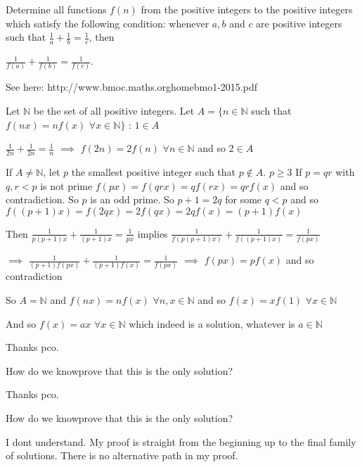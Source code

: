 \begin{solution}
	\begin{tcolorbox}Determine all functions $f(n)$ from the positive integers to the positive integers which satisfy the following condition: whenever $a, b$ and $c$ are positive integers such that $\frac{1}{a} + \frac{1}{b} = \frac{1}{c}$, then

$\frac{1}{f(a)} + \frac{1}{f(b)} = \frac{1}{f(c)}$.

See here: http://www.bmoc.maths.org\/home\/bmo1-2015.pdf\end{tcolorbox}
Let $\mathbb N$ be the set of all positive integers.
Let $A=\{n\in\mathbb N$ such that $f(nx)=nf(x)$ $\forall x\in\mathbb N\}$ : $1\in A$

$\frac 1{2n}+\frac 1{2n}=\frac 1{n}$ $\implies$ $f(2n)=2f(n)$ $\forall n\in\mathbb N$ and so $2\in A$

If $A\ne \mathbb N$, let $p$ the smallest positive integer such that $p\notin A$. $p\ge 3$
If $p=qr$ with $q,r<p$ is not prime $f(px)=f(qrx)=qf(rx)=qrf(x)$ and so contradiction. So $p$ is an odd prime.
So $p+1=2q$ for some $q<p$ and so $f((p+1)x)=f(2qx)=2f(qx)=2qf(x)=(p+1)f(x)$

Then $\frac 1{p(p+1)x}+\frac 1{(p+1)x}=\frac 1{px}$ implies $\frac 1{f(p(p+1)x)}+\frac 1{f((p+1)x)}=\frac 1{f(px)}$

$\implies$ $\frac 1{(p+1)f(px)}+\frac 1{(p+1)f(x)}=\frac 1{f(px)}$ $\implies$ $f(px)=pf(x)$ and so contradiction

So $A=\mathbb N$ and $f(nx)=nf(x)$ $\forall n,x\in\mathbb N$ and so $f(x)=xf(1)$ $\forall x\in\mathbb N$


And so $\boxed{f(x)=ax}$ $\forall x\in\mathbb N$ which indeed is a solution, whatever is $a\in\mathbb N$
\end{solution}



\begin{solution}
	Thanks pco.

How do we know\/prove that this is the only solution?
\end{solution}



\begin{solution}
	\begin{tcolorbox}Thanks pco.

How do we know\/prove that this is the only solution?\end{tcolorbox}
I dont understand. My proof is straight from the beginning up to the final family of solutions. There is no alternative path in my proof.
\end{solution}



